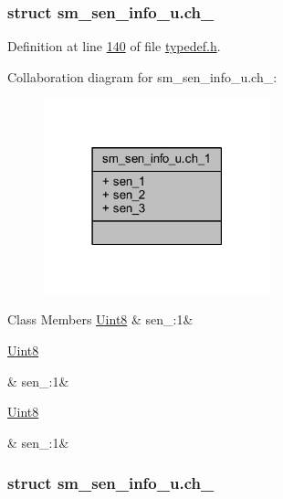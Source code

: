 \subsubsection{struct sm\+\_\+sen\+\_\+info\+\_\+u.\+ch\+\_}


Definition at line \hyperlink{a00001_source_l00140}{140} of file \hyperlink{a00001_source}{typedef.\+h}.



Collaboration diagram for sm\+\_\+sen\+\_\+info\+\_\+u.\+ch\+\_\+:
\nopagebreak
\begin{figure}[H]
\begin{center}
\leavevmode
\includegraphics[width=186pt]{dc/ded/a00252}
\end{center}
\end{figure}
\begin{DoxyFields}{Class Members}
\hypertarget{a00001_a226219dc5b8b7d5e5d1e7cf59aff4981}{\hyperlink{a00001_a979e3e23b9a449e69ab6a8a83b6042f8}{Uint8}}\label{a00001_a226219dc5b8b7d5e5d1e7cf59aff4981}
&
sen\+\_\+:1&
\\
\hline

\hypertarget{a00001_a7111d63086b336f186d5c29829ed8852}{\hyperlink{a00001_a979e3e23b9a449e69ab6a8a83b6042f8}{Uint8}}\label{a00001_a7111d63086b336f186d5c29829ed8852}
&
sen\+\_\+:1&
\\
\hline

\hypertarget{a00001_a25b93705f9c83a019eb4874d5e07cafd}{\hyperlink{a00001_a979e3e23b9a449e69ab6a8a83b6042f8}{Uint8}}\label{a00001_a25b93705f9c83a019eb4874d5e07cafd}
&
sen\+\_\+:1&
\\
\hline

\end{DoxyFields}
\label{d6/db3/a00130}
\hypertarget{a00001_d6/db3/a00130}{}
\subsubsection{struct sm\+\_\+sen\+\_\+info\+\_\+u.\+ch\+\_}


